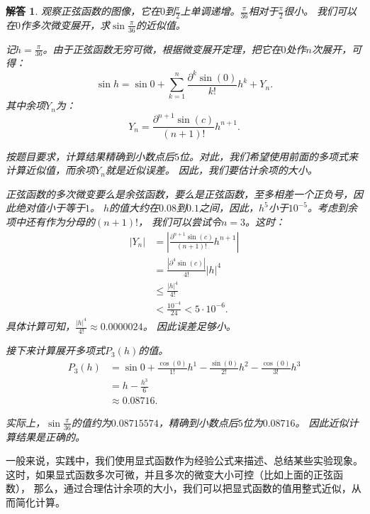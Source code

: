 \documentclass[12pt,UTF8]{ctexbook}
\newtheorem*{so}{解答}
\begin{document}
\begin{so}
    观察正弦函数的图像，它在$0$到$\frac{\pi}{2}$上单调递增。$\frac{\pi}{36}$相对于$\frac{\pi}{2}$很小。
    我们可以在$0$作多次微变展开，求$\sin{\frac{\pi}{36}}$的近似值。

    记$h = \frac{\pi}{36}$。由于正弦函数无穷可微，根据微变展开定理，把它在$0$处作$n$次展开，可得：
    $$ \sin{h} = \sin{0} + \sum_{k=1}^n \frac{\partial^k \sin (0)}{k!}h^k + Y_n. $$
    其中余项$Y_n$为：
    $$ Y_n = \frac{\partial^{n+1} \sin (c)}{(n+1)!}h^{n+1}. $$

    按题目要求，计算结果精确到小数点后$5$位。对此，我们希望使用前面的多项式来计算近似值，而余项$Y_n$就是近似误差。
    因此，我们要估计余项的大小。
    
    正弦函数的多次微变要么是余弦函数，要么是正弦函数，至多相差一个正负号，因此绝对值小于等于$1$。
    $h$的值大约在$0.08$到$0.1$之间，因此，$h^5$小于$10^{-5}$。考虑到余项中还有作为分母的$(n+1)!$，
    我们可以尝试令$n=3$。这时：
    \begin{align*}
        | Y_n| &= \left|\frac{\partial^{n+1} \sin (c)}{(n+1)!}h^{n+1}\right|  \\
        &= \frac{\left|\partial^{4} \sin (c)\right|}{4!}|h|^4  \\
        &\leqslant \frac{|h|^4}{4!}  \\
        &< \frac{10^{-4}}{24} < 5 \cdot 10^{-6}. 
    \end{align*}
    具体计算可知，$\frac{|h|^4}{4!} \approx 0.0000024$。
    因此误差足够小。


    接下来计算展开多项式$P_3(h)$的值。
    \begin{align*}
        P_3(h) &= \sin{0} + \frac{\cos (0)}{1!}h^1 - \frac{\sin (0)}{2!}h^2 - \frac{\cos (0)}{3!}h^3  \\
        &= h - \frac{h^3}{6}  \\
        &\approx 0.08716. 
    \end{align*}
    
    实际上，$\sin{\frac{\pi}{36}}$的值约为$0.08715574$，精确到小数点后$5$位为$0.08716$。
    因此近似计算结果是正确的。
\end{so}

一般来说，实践中，我们使用显式函数作为经验公式来描述、总结某些实验现象。
这时，如果显式函数多次可微，并且多次的微变大小可控（比如上面的正弦函数），
那么，通过合理估计余项的大小，我们可以把显式函数的值用整式近似，从而简化计算。
\end{document}
